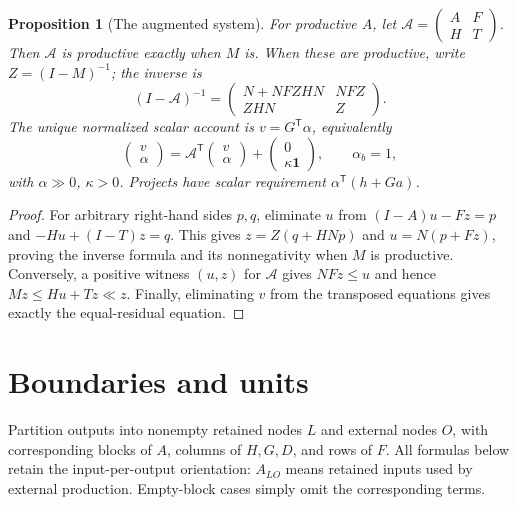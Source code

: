 \documentclass[11pt,a4paper]{article}
\newtheorem{proposition}[theorem]{Proposition}
\begin{document}
\begin{proposition}[The augmented system]
For productive $A$, let $\mathcal A=\left(\begin{smallmatrix}A&F\\H&T\end{smallmatrix}\right)$. Then $\mathcal A$ is productive exactly when $M$ is. When these are productive, write $Z=(I-M)^{-1}$; the inverse is
\begin{equation}
(I-\mathcal A)^{-1}=\begin{pmatrix}N+NFZHN&NFZ\\ZHN&Z\end{pmatrix}.
\end{equation}
The unique normalized scalar account is $v=G^{\mathsf T}\alpha$, equivalently
\begin{equation}
\begin{pmatrix}v\\\alpha\end{pmatrix}=\mathcal A^{\mathsf T}\begin{pmatrix}v\\\alpha\end{pmatrix}+\begin{pmatrix}0\\\kappa\mathbf1\end{pmatrix},\qquad\alpha_b=1,
\end{equation}
with $\alpha\gg0$, $\kappa>0$. Projects have scalar requirement $\alpha^{\mathsf T}(h+Ga)$.
\end{proposition}
\begin{proof}
For arbitrary right-hand sides $p,q$, eliminate $u$ from $(I-A)u-Fz=p$ and $-Hu+(I-T)z=q$. This gives $z=Z(q+HNp)$ and $u=N(p+Fz)$, proving the inverse formula and its nonnegativity when $M$ is productive. Conversely, a positive witness $(u,z)$ for $\mathcal A$ gives $NFz\leq u$ and hence $Mz\leq Hu+Tz\ll z$. Finally, eliminating $v$ from the transposed equations gives exactly the equal-residual equation.
\end{proof}

\section{Boundaries and units}
Partition outputs into nonempty retained nodes $L$ and external nodes $O$, with corresponding blocks of $A$, columns of $H,G,D$, and rows of $F$. All formulas below retain the input-per-output orientation: $A_{LO}$ means retained inputs used by external production. Empty-block cases simply omit the corresponding terms.
\end{document}
